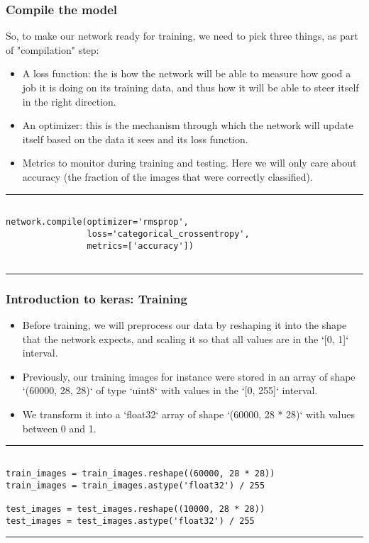 \documentclass[11pt]{beamer}
\begin{document}
\begin{frame}[fragile]
\frametitle{Compile the model}
\scriptsize

So, to make our network ready for training, we need to pick three things, as part of "compilation" step:
\begin{itemize}
\item A loss function: the is how the network will be able to measure how good a job it is doing on its training data, and thus how it will be 
able to steer itself in the right direction.
\item  An optimizer: this is the mechanism through which the network will update itself based on the data it sees and its loss function.
\item Metrics to monitor during training and testing. Here we will only care about accuracy (the fraction of the images that were correctly 
classified).
\end{itemize}

\rule{\textwidth}{1pt}
\begin{verbatim}

network.compile(optimizer='rmsprop',
                loss='categorical_crossentropy',
                metrics=['accuracy'])
                
\end{verbatim}
\rule{\textwidth}{1pt}
\end{frame}
\begin{frame}[fragile]
\frametitle{Introduction to keras: Training}
\scriptsize

	\begin{itemize}
	\item 
Before training, we will preprocess our data by reshaping it into the shape that the network expects, and scaling it so that all values are in 
the `[0, 1]` interval. 
\item Previously, our training images for instance were stored in an array of shape `(60000, 28, 28)` of type `uint8` with 
values in the `[0, 255]` interval. 
\item We transform it into a `float32` array of shape `(60000, 28 * 28)` with values between 0 and 1.
	\end{itemize}
\rule{\textwidth}{1pt}
\begin{verbatim}

train_images = train_images.reshape((60000, 28 * 28))
train_images = train_images.astype('float32') / 255

test_images = test_images.reshape((10000, 28 * 28))
test_images = test_images.astype('float32') / 255

\end{verbatim}
\rule{\textwidth}{1pt}
\end{frame}
\end{document}
